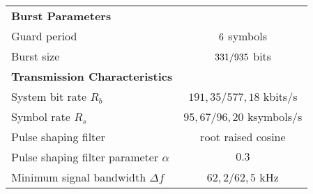 \begin{table}[htbp]
\begin{tabular}{lc}
    \rowcolor[rgb]{ 0,  0,  0} \textcolor[rgb]{ 1,  1,  1}{\textbf{Burst Parameters}} & \textcolor[rgb]{ 1,  1,  1}{} 					\\
    	Guard period 									& $6$ symbols							\\
    	Burst size 										& $331 / 935$ bits 			\\
    	
    \rowcolor[rgb]{ 0,  0,  0} \textcolor[rgb]{ 1,  1,  1}{\textbf{Transmission Characteristics}} & \textcolor[rgb]{ 1,  1,  1}{} 		\\
    	System bit rate $R_b$ 							& $191,35 / 577,18$ kbits/s 							\\
    	Symbol rate $R_s$ 								& $95,67 / 96,20$ ksymbols/s 							\\
    	Pulse shaping filter 								& root raised cosine 									\\
    	Pulse shaping filter parameter $\alpha$ 				& $0.3$ 											\\
    	Minimum signal bandwidth $\Delta f$ 				& $62,2 / 62,5$ kHz 									\\
    \end{tabular}
  \label{tab:specs_data}
\end{table}

